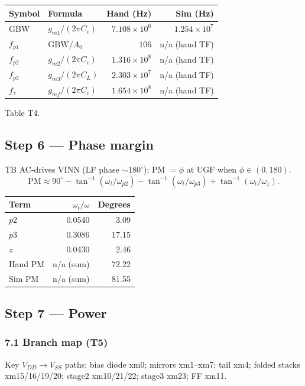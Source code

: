 \documentclass[11pt]{article}
\begin{document}
\begin{center}
\begin{tabular}{llrr}
\toprule
Symbol & Formula & Hand (Hz) & Sim (Hz) \\
\midrule
GBW & \(g_{m1}/(2\pi C_c)\) & \(7.108\times10^{6}\) & \(1.254\times10^{7}\) \\
\(f_{p1}\) & \(\mathrm{GBW}/A_0\) & \(106\) & n/a (hand TF) \\
\(f_{p2}\) & \(g_{m2}/(2\pi C_c)\) & \(1.316\times10^{8}\) & n/a (hand TF) \\
\(f_{p3}\) & \(g_{m3}/(2\pi C_L)\) & \(2.303\times10^{7}\) & n/a (hand TF) \\
\(f_{z}\) & \(g_{mf}/(2\pi C_c)\) & \(1.654\times10^{8}\) & n/a (hand TF) \\
\bottomrule
\end{tabular}
\end{center}
\footnotesize Table T4.

\subsection{Step 6 --- Phase margin}
TB AC-drives VINN (LF phase \(\sim180^\circ\)); PM \(=\phi\) at UGF when \(\phi\in(0,180)\).
\[
\mathrm{PM}\approx90^\circ-\tan^{-1}(\omega_t/\omega_{p2})-\tan^{-1}(\omega_t/\omega_{p3})+\tan^{-1}(\omega_t/\omega_z).
\]
\begin{center}
\begin{tabular}{lrr}
\toprule
Term & \(\omega_t/\omega\) & Degrees \\
\midrule
\(p2\) & 0.0540 & 3.09 \\
\(p3\) & 0.3086 & 17.15 \\
\(z\) & 0.0430 & 2.46 \\
\midrule
Hand PM & n/a (sum) & 72.22 \\
Sim PM & n/a (sum) & 81.55 \\
\bottomrule
\end{tabular}
\end{center}

\subsection{Step 7 --- Power}
\subsubsection{7.1 Branch map (T5)}
Key \(V_{DD}\to V_{SS}\) paths: bias diode xm0; mirrors xm1--xm7; tail xm4; folded stacks xm15/16/19/20; stage2 xm10/21/22; stage3 xm23; FF xm11.
\end{document}
